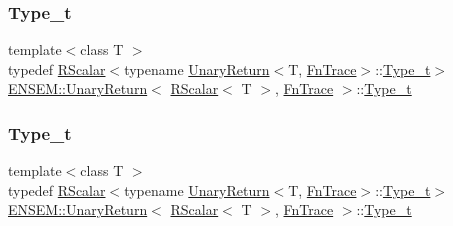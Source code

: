\subsubsection{\texorpdfstring{Type\_t}{Type\_t}\hspace{0.1cm}{\footnotesize\ttfamily [1/3]}}
{\footnotesize\ttfamily template$<$class T $>$ \\
typedef \mbox{\hyperlink{classENSEM_1_1RScalar}{R\+Scalar}}$<$typename \mbox{\hyperlink{structENSEM_1_1UnaryReturn}{Unary\+Return}}$<$T, \mbox{\hyperlink{structENSEM_1_1FnTrace}{Fn\+Trace}}$>$\+::\mbox{\hyperlink{structENSEM_1_1UnaryReturn_3_01RScalar_3_01T_01_4_00_01FnTrace_01_4_a1fbf2ac97cda49c4f5347aa1df4559aa}{Type\+\_\+t}}$>$ \mbox{\hyperlink{structENSEM_1_1UnaryReturn}{E\+N\+S\+E\+M\+::\+Unary\+Return}}$<$ \mbox{\hyperlink{classENSEM_1_1RScalar}{R\+Scalar}}$<$ T $>$, \mbox{\hyperlink{structENSEM_1_1FnTrace}{Fn\+Trace}} $>$\+::\mbox{\hyperlink{structENSEM_1_1UnaryReturn_3_01RScalar_3_01T_01_4_00_01FnTrace_01_4_a1fbf2ac97cda49c4f5347aa1df4559aa}{Type\+\_\+t}}}

\mbox{\label{structENSEM_1_1UnaryReturn_3_01RScalar_3_01T_01_4_00_01FnTrace_01_4_a1fbf2ac97cda49c4f5347aa1df4559aa}} 
\subsubsection{\texorpdfstring{Type\_t}{Type\_t}\hspace{0.1cm}{\footnotesize\ttfamily [2/3]}}
{\footnotesize\ttfamily template$<$class T $>$ \\
typedef \mbox{\hyperlink{classENSEM_1_1RScalar}{R\+Scalar}}$<$typename \mbox{\hyperlink{structENSEM_1_1UnaryReturn}{Unary\+Return}}$<$T, \mbox{\hyperlink{structENSEM_1_1FnTrace}{Fn\+Trace}}$>$\+::\mbox{\hyperlink{structENSEM_1_1UnaryReturn_3_01RScalar_3_01T_01_4_00_01FnTrace_01_4_a1fbf2ac97cda49c4f5347aa1df4559aa}{Type\+\_\+t}}$>$ \mbox{\hyperlink{structENSEM_1_1UnaryReturn}{E\+N\+S\+E\+M\+::\+Unary\+Return}}$<$ \mbox{\hyperlink{classENSEM_1_1RScalar}{R\+Scalar}}$<$ T $>$, \mbox{\hyperlink{structENSEM_1_1FnTrace}{Fn\+Trace}} $>$\+::\mbox{\hyperlink{structENSEM_1_1UnaryReturn_3_01RScalar_3_01T_01_4_00_01FnTrace_01_4_a1fbf2ac97cda49c4f5347aa1df4559aa}{Type\+\_\+t}}}

